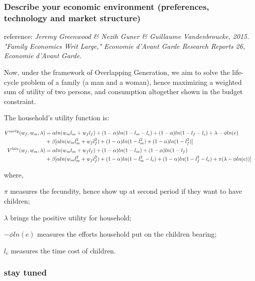 \documentclass{article}[a4paper]
\begin{document}
\subsubsection{Describe your economic environment (preferences, technology and market structure)}

reference: \textit{Jeremy Greenwood \& Nezih Guner \& Guillaume Vandenbroucke, 2015. "Family Economics Writ Large," Economie d'Avant Garde Research Reports 26, Economie d'Avant Garde.}

Now, under the framework of Overlapping Generation, we aim to solve the life-cycle problem of a family (a man and a woman), hence maximizing a weighted sum of utility of two persons, and consumption altogether shown in the budget constraint.

The household’s utility function is: 

\begin{align}
V^{early}(w_f,w_m,\lambda)&=\alpha ln(w_m l_m + w_f l_f) + (1-\alpha)ln(1-l_m-l_c) + (1-\alpha)ln(1-l_f-l_c) + \lambda -\phi ln(e)\\
&+ \beta [\alpha ln(w_m l^2_m + w_f l^2_f) + (1-\alpha)ln(1-l^2_m) + (1-\alpha)ln(1-l^2_f) ] \\
\medskip
V^{late}(w_f,w_m,\lambda) &= \alpha ln(w_m l_m + w_f l_f) + (1-\alpha)ln(1-l_m) + (1-\alpha)ln(1-l_f)\\
&+ \beta [\alpha ln(w_m l^2_m + w_f l^2_f) + (1-\alpha)ln(1-l^2_m-l_c) + (1-\alpha)ln(1-l^2_f-l_c) + \pi (\lambda -\phi ln(e))] 
\end{align}

where, 

$\pi$ measures the fecundity, hence show up at second period if they want to have children;

$\lambda$ brings the positive utility for household;

$-\phi ln(e)$ measures the efforts household put on the children bearing;

$l_c$ measures the time cost of children. 

\subsubsection{stay tuned}
\end{document}
